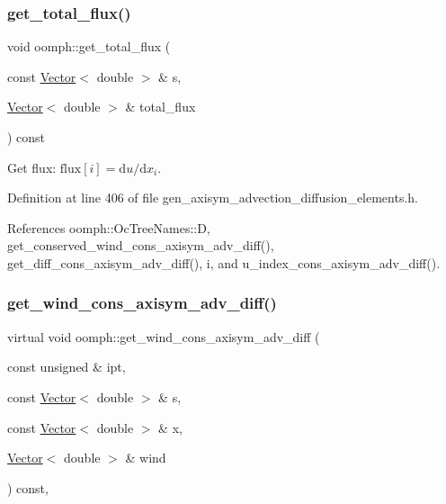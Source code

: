 \mbox{\label{namespaceoomph_a6bbeae059a0f06fc51b97fd76be99067}} 
\subsubsection{\texorpdfstring{get\+\_\+total\+\_\+flux()}{get\_total\_flux()}}
{\footnotesize\ttfamily void oomph\+::get\+\_\+total\+\_\+flux (\begin{DoxyParamCaption}\item[{const \hyperlink{classoomph_1_1Vector}{Vector}$<$ double $>$ \&}]{s,  }\item[{\hyperlink{classoomph_1_1Vector}{Vector}$<$ double $>$ \&}]{total\+\_\+flux }\end{DoxyParamCaption}) const}



Get flux\+: $\mbox{flux}[i] = \mbox{d}u / \mbox{d}x_i $. 



Definition at line 406 of file gen\+\_\+axisym\+\_\+advection\+\_\+diffusion\+\_\+elements.\+h.



References oomph\+::\+Oc\+Tree\+Names\+::D, get\+\_\+conserved\+\_\+wind\+\_\+cons\+\_\+axisym\+\_\+adv\+\_\+diff(), get\+\_\+diff\+\_\+cons\+\_\+axisym\+\_\+adv\+\_\+diff(), i, and u\+\_\+index\+\_\+cons\+\_\+axisym\+\_\+adv\+\_\+diff().

\mbox{\label{namespaceoomph_aa6e74f36ccca7009265f81f333c4b5df}} 
\subsubsection{\texorpdfstring{get\+\_\+wind\+\_\+cons\+\_\+axisym\+\_\+adv\+\_\+diff()}{get\_wind\_cons\_axisym\_adv\_diff()}}
{\footnotesize\ttfamily virtual void oomph\+::get\+\_\+wind\+\_\+cons\+\_\+axisym\+\_\+adv\+\_\+diff (\begin{DoxyParamCaption}\item[{const unsigned \&}]{ipt,  }\item[{const \hyperlink{classoomph_1_1Vector}{Vector}$<$ double $>$ \&}]{s,  }\item[{const \hyperlink{classoomph_1_1Vector}{Vector}$<$ double $>$ \&}]{x,  }\item[{\hyperlink{classoomph_1_1Vector}{Vector}$<$ double $>$ \&}]{wind }\end{DoxyParamCaption}) const\hspace{0.3cm}{\ttfamily [inline]}, {\ttfamily [virtual]}}



